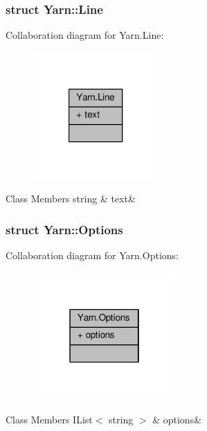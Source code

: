 \subsubsection{struct Yarn\-:\-:Line}


Collaboration diagram for Yarn.\-Line\-:
\nopagebreak
\begin{figure}[H]
\begin{center}
\leavevmode
\includegraphics[width=136pt]{d4/db5/a00328}
\end{center}
\end{figure}
\begin{DoxyFields}{Class Members}
\hypertarget{a00029_a81d1f04bbb4cf6642d2bd685bda1da20}{string}\label{a00029_a81d1f04bbb4cf6642d2bd685bda1da20}
&
text&
\\
\hline

\end{DoxyFields}
\label{d2/d41/a00318}
\hypertarget{a00029_d2/d41/a00318}{}
\subsubsection{struct Yarn\-:\-:Options}


Collaboration diagram for Yarn.\-Options\-:
\nopagebreak
\begin{figure}[H]
\begin{center}
\leavevmode
\includegraphics[width=154pt]{dd/d4e/a00329}
\end{center}
\end{figure}
\begin{DoxyFields}{Class Members}
\hypertarget{a00029_ae8c616d923ceeeed192a9436c55d9917}{I\-List$<$ string $>$}\label{a00029_ae8c616d923ceeeed192a9436c55d9917}
&
options&
\\
\hline

\end{DoxyFields}
\label{d7/df2/a00312}
\hypertarget{a00029_d7/df2/a00312}{}
